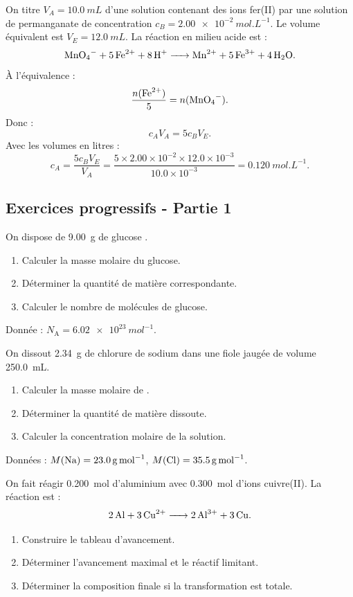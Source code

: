 \documentclass[11pt,a4paper]{article}
\newcommand{\Na}{N_{\mathrm A}}
\begin{document}
\begin{exemplebox}
On titre $V_A=\SI{10.0}{mL}$ d'une solution contenant des ions fer(II)  par une solution de permanganate  de concentration $c_B=\SI{2.00e-2}{mol.L^{-1}}$. Le volume équivalent est $V_E=\SI{12.0}{mL}$. La réaction en milieu acide est :
\[
\ce{MnO4^- + 5 Fe^{2+} + 8H+ -> Mn^{2+} + 5Fe^{3+} + 4H2O}.
\]
À l'équivalence :
\[
\frac{n(\ce{Fe^{2+}})}{5}=n(\ce{MnO4^-}).
\]
Donc :
\[
c_A V_A =5c_B V_E.
\]
Avec les volumes en litres :
\[
c_A=\frac{5c_BV_E}{V_A}=\frac{5\times2.00\times10^{-2}\times12.0\times10^{-3}}{10.0\times10^{-3}}
=\SI{0.120}{mol.L^{-1}}.
\]
\end{exemplebox}

\subsection{Exercices progressifs - Partie 1}

\begin{exercicebox}[title=Exercice 1 - Quantité de matière]
On dispose de \SI{9.00}{g} de glucose .
\begin{enumerate}
\item Calculer la masse molaire du glucose.
\item Déterminer la quantité de matière correspondante.
\item Calculer le nombre de molécules de glucose.
\end{enumerate}
Donnée : $\Na=\SI{6.02e23}{mol^{-1}}$.
\end{exercicebox}

\begin{exercicebox}[title=Exercice 2 - Solution et concentration]
On dissout \SI{2.34}{g} de chlorure de sodium  dans une fiole jaugée de volume \SI{250.0}{mL}.
\begin{enumerate}
\item Calculer la masse molaire de .
\item Déterminer la quantité de matière dissoute.
\item Calculer la concentration molaire de la solution.
\end{enumerate}
Données : $M(\ce{Na})=\SI{23.0}{g.mol^{-1}}$, $M(\ce{Cl})=\SI{35.5}{g.mol^{-1}}$.
\end{exercicebox}

\begin{exercicebox}[title=Exercice 3 - Tableau d'avancement]
On fait réagir \SI{0.200}{mol} d'aluminium avec \SI{0.300}{mol} d'ions cuivre(II). La réaction est :
\[
\ce{2Al + 3Cu^{2+} -> 2Al^{3+} + 3Cu}.
\]
\begin{enumerate}
\item Construire le tableau d'avancement.
\item Déterminer l'avancement maximal et le réactif limitant.
\item Déterminer la composition finale si la transformation est totale.
\end{enumerate}
\end{exercicebox}
\end{document}
